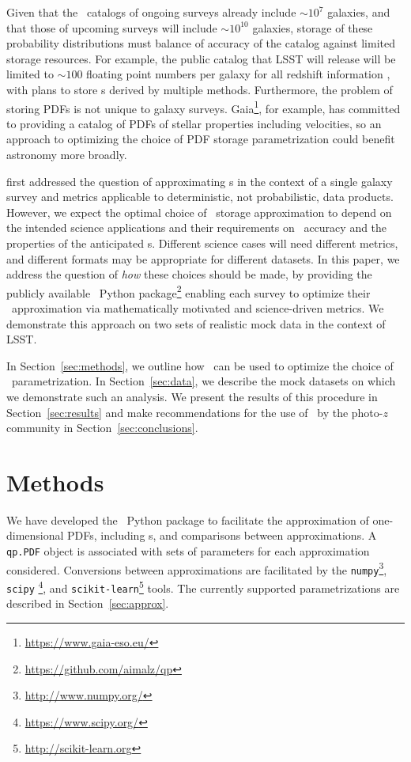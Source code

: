 Given that the \pz\ catalogs of ongoing surveys already include $\sim10^{7}$ 
galaxies, and that those of upcoming surveys will include $\sim10^{10}$ 
galaxies, storage of these probability distributions must balance of accuracy 
of the catalog against limited storage resources.
For example, the public catalog that LSST will release will be limited to 
$\sim100$ floating point numbers per galaxy for all redshift information 
\citep[Section 4.2.2]{juric_data_2017}, with plans to store \pz s derived by 
multiple methods.
Furthermore, the problem of storing PDFs is not unique to galaxy surveys.
Gaia\footnote{\url{https://www.gaia-eso.eu/}}, for example, has committed to 
providing a catalog of PDFs of stellar properties including velocities, so an 
approach to optimizing the choice of PDF storage parametrization could benefit 
astronomy more broadly.

\citet{carrasco_kind_sparse_2014} first addressed the question of approximating 
\pz s in the context of a single galaxy survey and metrics applicable to 
deterministic, not probabilistic, data products.
However, we expect the optimal choice of \pz\ storage approximation to depend 
on the intended science applications and their requirements on \pz\ accuracy 
and the properties of the anticipated \pz s.
Different science cases will need different metrics, and different formats may 
be appropriate for different datasets.
In this paper, we address the question of \textit{how} these choices should be 
made, by providing the publicly available \qp\ Python 
package\footnote{\url{https://github.com/aimalz/qp}} enabling each survey to 
optimize their \pz\ approximation via mathematically motivated and 
science-driven metrics.
We demonstrate this approach on two sets of realistic mock data in the context 
of LSST.

In Section~\ref{sec:methods}, we outline how \qp\ can be used to optimize the 
choice of \pz\ parametrization.
In Section~\ref{sec:data}, we describe the mock datasets on which we 
demonstrate such an analysis.
We present the results of this procedure in Section~\ref{sec:results} and make 
recommendations for the use of \qp\ by the photo-$z$ community in 
Section~\ref{sec:conclusions}.

\section{Methods}


We have developed the \qp\ Python package to facilitate the approximation of 
one-dimensional PDFs, including \pz s, and comparisons between approximations.
A \texttt{qp.PDF} object is associated with sets of parameters for each 
approximation considered.
Conversions between approximations are facilitated by the 
\texttt{numpy}\footnote{\url{http://www.numpy.org/}}, \texttt{scipy} 
\footnote{\url{https://www.scipy.org/}}, and 
\texttt{scikit-learn}\footnote{\url{http://scikit-learn.org}} 
\citep{pedregosa_scikit-learn:_2011} tools.
The currently supported parametrizations are described in 
Section~\ref{sec:approx}.

